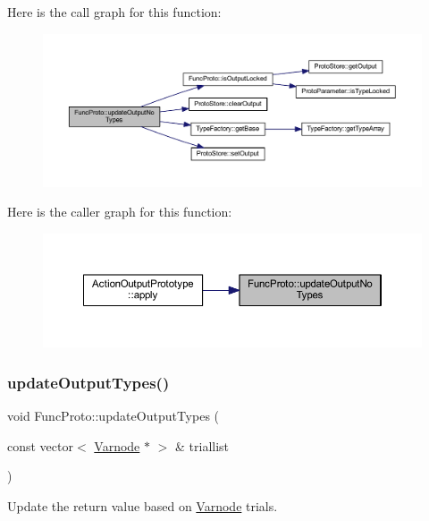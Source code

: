 Here is the call graph for this function\+:
\nopagebreak
\begin{figure}[H]
\begin{center}
\leavevmode
\includegraphics[width=350pt]{class_func_proto_a882e34d08f3e4e44ba5aa25b87c84bfe_cgraph}
\end{center}
\end{figure}
Here is the caller graph for this function\+:
\nopagebreak
\begin{figure}[H]
\begin{center}
\leavevmode
\includegraphics[width=350pt]{class_func_proto_a882e34d08f3e4e44ba5aa25b87c84bfe_icgraph}
\end{center}
\end{figure}
\mbox{\label{class_func_proto_a56cbde2e23cdcf41ddb870721e02be6b}} 
\subsubsection{\texorpdfstring{updateOutputTypes()}{updateOutputTypes()}}
{\footnotesize\ttfamily void Func\+Proto\+::update\+Output\+Types (\begin{DoxyParamCaption}\item[{const vector$<$ \mbox{\hyperlink{class_varnode}{Varnode}} $\ast$ $>$ \&}]{triallist }\end{DoxyParamCaption})}



Update the return value based on \mbox{\hyperlink{class_varnode}{Varnode}} trials. 

